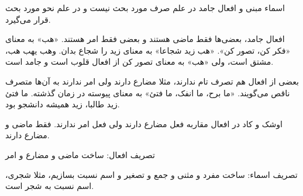 \documentclass{article}
\begin{document}
\begin{addpage}{5}
  \vspace*{3cm}
  \begin{note}
    اسماء مبنی و افعال جامد در علم صرف مورد بحث نیست و در علم نحو مورد بحث قرار می‌گیرد.
  \end{note}
  \begin{note}
    افعال جامد، بعضی‌ها فقط ماضی هستند و بعضی فقط امر هستند. «هب» به معنای «فکر کن، تصور کن». «هب زید شجاعا» به معنای زید را شجاع بدان.
    وهب یهب هب، مشتق است، ولی «هب» به معنای تصور کن از افعال قلوب است و جامد است.
  \end{note}
  \begin{note}
    بعضی از افعال هم تصرف تام ندارند، مثلا مضارع دارند ولی امر ندارند به آن‌ها متصرف ناقص می‌گویند. «ما برح، ما انفک، ما فتئ» به معنای پیوسته در زمان گذشته.
    ما فتئ زید طالبا، زید همیشه دانشجو بود.
  \end{note}
  \begin{note}
    اوشک و کاد در افعال مقاربه فعل مضارع دارند ولی فعل امر ندارند. فقط ماضی و مضارع دارند.
  \end{note}
  \vspace*{3cm}
  \begin{note}
    تصریف افعال: ساخت ماضی و مضارع و امر
  \end{note}
  \begin{note}
    تصریف اسماء: ساخت مفرد و مثنی و جمع و تصغیر و اسم نسبت بسازیم، مثلا شجری، اسم نسبت به شجر است.
  \end{note}
\end{addpage}

\begin{addpage}{6}
\end{addpage}
\end{document}

